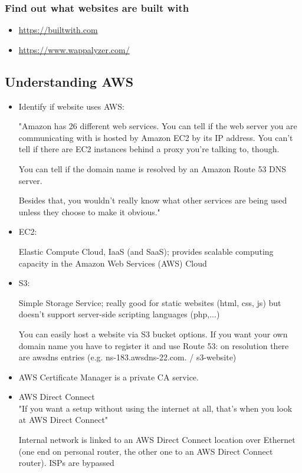 \documentclass[12pt]{article}
\begin{document}
\subsubsection*{Find out what websites are built with}
\begin{itemize}
    \item \url{https://builtwith.com}
    \item \url{https://www.wappalyzer.com/}
\end{itemize}


\newpage
\subsection*{Understanding AWS}
\begin{itemize}
    \item Identify if website uses AWS:
    
    "Amazon has 26 different web services. You can tell if the web server you are communicating with is hosted by Amazon EC2 by its IP address. You can't tell if there are EC2 instances behind a proxy you're talking to, though.

    You can tell if the domain name is resolved by an Amazon Route 53 DNS server.

    Besides that, you wouldn't really know what other services are being used unless they choose to make it obvious."
    
    \item EC2:
    
    Elastic Compute Cloud, IaaS (and SaaS); provides scalable computing capacity in the Amazon Web Services (AWS) Cloud
    
    \item S3:
    
    Simple Storage Service; really good for static websites (html, css, js) but doesn't support server-side scripting languages (php,...)
    
    You can easily host a website via S3 bucket options. If you want your own domain name you have to register it and use Route 53: on resolution there are awsdns entries (e.g. ns-183.awsdns-22.com. / s3-website)
    
    \item AWS Certificate Manager is a private CA service.
    
    \item AWS Direct Connect \\
    "If you want a setup without using the internet at all, that's when you look at AWS Direct Connect" 
    
    Internal network is linked to an AWS Direct Connect location over Ethernet (one end on personal router, the other one to an AWS Direct Connect router). ISPs are bypassed
    
    
    
\end{itemize}
\end{document}
